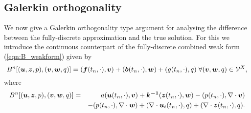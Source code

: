 

\subsection{Galerkin orthogonality}
We now give a Galerkin orthogonality type argument for analysing the difference between the fully-discrete approximation and the true solution. For this we introduce the continuous counterpart of the fully-discrete combined weak form (\ref{eqn:B_weakform}) given by
\begin{equation*}
\label{eqn:Bcont_weakform}
B^{n}[(\boldsymbol{u},\boldsymbol{z},p),(\boldsymbol{v},\boldsymbol{w},{q})] = (\boldsymbol{f}(t_{n},\cdot),\boldsymbol{v})  +   (\boldsymbol{b}(t_{n},\cdot),\boldsymbol{w})   + (g(t_{n},\cdot),{q}) \; \forall (\boldsymbol{v},\boldsymbol{w},{q}) \in \mathcal{V}^{X},
\end{equation*}
where
\begin{eqnarray*}
\label{B_weak_form_cont}
B^{n}[(\boldsymbol{u},\boldsymbol{z},p),(\boldsymbol{v},\boldsymbol{w},{q})]&=&a({\boldsymbol{u}(t_{n}, \cdot)},\boldsymbol{v})+\boldsymbol{k^{-1}}( \boldsymbol{z}(t_{n},\cdot), \boldsymbol{w}) - ({p(t_{n},\cdot)}, \nabla \cdot \boldsymbol{v}) \\
&& - ({p(t_{n},\cdot)}, \nabla \cdot \boldsymbol{w}) + (\nabla \cdot {\boldsymbol{u}_{t}}(t_{n},\cdot),{q})  + (\nabla \cdot \boldsymbol{z}(t_{n},\cdot),{q} ).
\end{eqnarray*}

